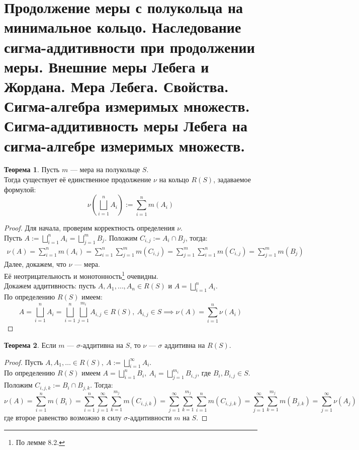 \documentclass[11pt,a4paper]{report}
\theoremstyle{definition}
\theoremstyle{definition}
\newtheorem{theorem}{Теорема}[section]
\theoremstyle{definition}
\begin{document}
	\section{Продолжение меры с полукольца на минимальное кольцо. Наследование сигма-аддитивности при продолжении меры. Внешние меры Лебега и Жордана. Мера Лебега. Свойства. Сигма-алгебра измеримых множеств. Сигма-аддитивность меры Лебега на сигма-алгебре измеримых множеств.}
	\begin{theorem}
		Пусть $ m $ — мера на полукольце $ S $.\\ 
		Тогда существует её единственное продолжение $ \nu $ на кольцо $ R(S) $, задаваемое формулой:
		\[ \nu\left (\bigsqcup_{i=1}^{n}{A_{i}}\right ) := \sum_{i=1}^{n}{m(A_{i})} \]
	\end{theorem}
	\begin{proof}
		Для начала, проверим корректность определения $ \nu $.\\
		Пусть $ A := \bigsqcup_{i=1}^{n}{A_{i}} = \bigsqcup_{j=1}^{m}{B_{j}} $. Положим $ C_{i, j} := A_{i} \cap B_{j} $, тогда: 
		\begin{gather*}
			\nu(A) = \sum_{i=1}^{n}{m(A_{i})} =   \sum_{i=1}^{n}{\sum_{j=1}^{m}{m(C_{i, j})}} = \sum_{j=1}^{m}{\sum_{i=1}^{n}{m(C_{i, j})}} = \sum_{j=1}^{m}{m(B_{j})}
		\end{gather*}
		Далее, докажем, что $ \nu $ — мера.\\
		Её неотрицательность и монотонность\footnote{По лемме 8.2.} очевидны.\\
		Докажем аддитивность: пусть $ A, A_{1}, \dots, A_{n} \in R(S) $ и $ A = \bigsqcup_{i=1}^{n}{A_{i}} $.\\
		По определению $ R(S) $ имеем:
	 \[ A = \bigsqcup_{i=1}^{n}{A_{i}} = \bigsqcup_{i=1}^{n}{\bigsqcup_{j=1}^{m_{i}}{A_{i, j}}} \in R(S),\ A_{i, j} \in S \implies \nu(A) = \sum_{i=1}^{n}{\nu(A_{i})} \]
	\end{proof}
	\begin{theorem}
		 Если $ m $ — $ \sigma $-аддитивна на $ S $, то $ \nu $ — $ \sigma $ аддитивна на $ R(S) $.
	\end{theorem}
	\begin{proof}
		Пусть $ A, A_{1}, \dots \in R(S),\ A := \bigsqcup_{i=1}^{\infty}{A_{i}} $.\\
		По определению $ R(S) $ имеем $ A = \bigsqcup_{i=1}^{n}{B_{i}},\ A_{i} = \bigsqcup_{j=1}^{m_{i}}{B_{i, j}} $, где $ B_{i}, B_{i, j} \in S $.\\
		Положим $ C_{i, j, k} := B_{i} \cap B_{j, k} $. Тогда: 
		\[ \nu(A) = \sum_{i=1}^{n}{m(B_{i})} = \sum_{i=1}^{n}{\sum_{j=1}^{\infty}{\sum_{k=1}^{m_{j}}{m(C_{i, j, k})}}} = \sum_{j=1}^{\infty}{\sum_{k=1}^{m_{j}}{\sum_{i=1}^{n}{m(C_{i, j, k})}}} = \sum_{j=1}^{\infty}{\sum_{k=1}^{m_{j}}{m(B_{j, k})}} = \sum_{j=1}^{\infty}{\nu(A_{j})} \]
		где второе равенство возможно в силу $ \sigma $-аддитивности $ m $ на $ S $.
	\end{proof}
\end{document}
